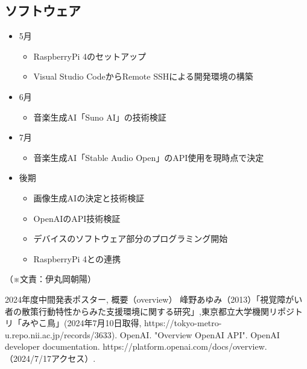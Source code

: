 \documentclass[11pt,a4paper]{report}
\newcommand{\Writer}[1]{
  \normalsize
  \begin{flushright}
    （※文責：#1）
  \end{flushright}
}
\begin{document}
\subsection{ソフトウェア}
\noindent\space
\begin{itemize}
  \item 5月
  \begin{itemize}
    \item RaspberryPi 4のセットアップ
    \item Visual Studio CodeからRemote SSHによる開発環境の構築
  \end{itemize}
  \item 6月
  \begin{itemize}
    \item 音楽生成AI「Suno AI」の技術検証 
  \end{itemize}
  \item 7月
  \begin{itemize}
    \item 音楽生成AI「Stable Audio Open」のAPI使用を現時点で決定
  \end{itemize}
  \item 後期
  \begin{itemize}
    \item 画像生成AIの決定と技術検証
    \item OpenAIのAPI技術検証
    \item デバイスのソフトウェア部分のプログラミング開始
    \item RaspberryPi 4との連携
  \end{itemize}
\end{itemize}
\Writer{伊丸岡朝陽}

\newpage
{}
\begin{thebibliography}{3}
   2024年度中間発表ポスター, 概要（overview）
   峰野あゆみ（2013）「視覚障がい者の散策行動特性からみた支援環境に関する研究」,東京都立大学機関リポジトリ「みやこ鳥」(2024年7月10日取得, https://tokyo-metro-u.repo.nii.ac.jp/records/3633).
   OpenAI. "Overview OpenAI API". OpenAI developer documentation. https://platform.openai.com/docs/overview. （2024/7/17アクセス）.
\end{thebibliography}
\end{document}
